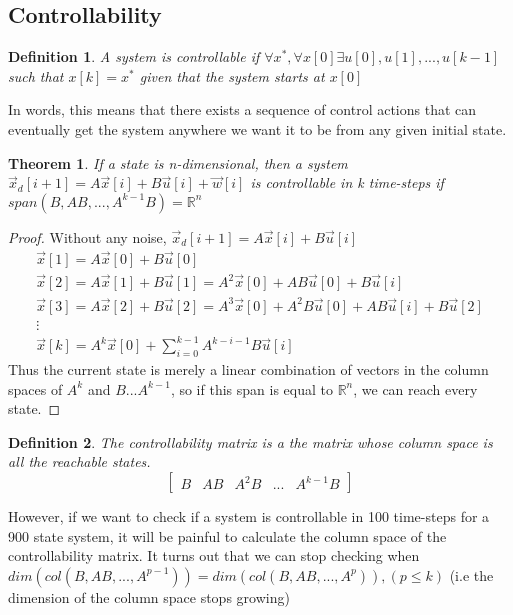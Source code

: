\documentclass{article}
\newtheorem{theorem}{Theorem}
\newtheorem{definition}{Definition}
\newtheorem{proof}{Proof}
\begin{document}
\subsection{Controllability}
\begin{definition}
    A system is controllable if $\forall x^*, \forall x[0] \exists u[0],u[1],...,u[k-1]$ such that $x[k]=x^*$ given that the system starts at $x[0]$
\end{definition}
In words, this means that there exists a sequence of control actions that can eventually get the system anywhere we want it to be from any given initial state.
\begin{theorem}
    If a state is n-dimensional, then a system $\vec{x}_d[i+1]=A\vec{x}[i]+B\vec{u}[i]+\vec{w}[i]$ is controllable in k time-steps if $span(B, AB, ..., A^{k-1}B)=\mathbb{R}^n$
\end{theorem}
\begin{proof}
    Without any noise, $\vec{x}_d[i+1]=A\vec{x}[i]+B\vec{u}[i]$
    \[
        \begin{array}{c}
            \vec{x}[1]=A\vec{x}[0]+B\vec{u}[0]\\
            \vec{x}[2]=A\vec{x}[1]+B\vec{u}[1] = A^2\vec{x}[0]+AB\vec{u}[0]+B\vec{u}[i]\\
            \vec{x}[3]=A\vec{x}[2]+B\vec{u}[2] = A^3\vec{x}[0]+A^2B\vec{u}[0]+AB\vec{u}[i]+B\vec{u}[2]\\
            \vdots\\
            \vec{x}[k]=A^k\vec{x}[0]+\sum_{i=0}^{k-1}{A^{k-i-1}B\vec{u}[i]}
        \end{array}
        \]
    Thus the current state is merely a linear combination of vectors in the column spaces of $A^k$ and $B...A^{k-1}$, so if this span is equal to $\mathbb{R}^n$, we can reach every state.
\end{proof}
\begin{definition}
    The controllability matrix is a the matrix whose column space is all the reachable states.
    \[
        \left[
            \begin{array}{c|c|c|c|c}
                B & AB & A^2B & ... & A^{k-1}B
            \end{array}
        \right]
        \]
\end{definition}
However, if we want to check if a system is controllable in 100 time-steps for a 900 state system, it will be painful to calculate the column space of the controllability matrix.
It turns out that we can stop checking when $dim(col(B, AB,...,A^{p-1}))=dim(col(B, AB, ..., A^p)), (p \leq k)$ (i.e the dimension of the column space stops growing)
\end{document}
